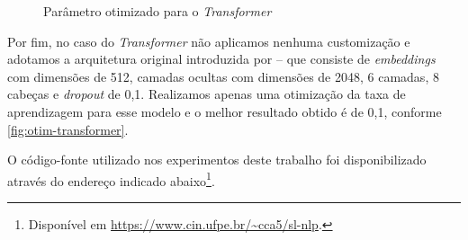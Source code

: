 \begin{figure}[ht!]
    \centering
    \caption{\textmd{Parâmetro otimizado para o \textit{Transformer}}}
    \nomefonte{}
    \label{fig:otim-transformer}
\end{figure}



Por fim, no caso do \textit{Transformer} não aplicamos nenhuma customização e adotamos a arquitetura original introduzida por  -- que consiste de \textit{embeddings} com dimensões de 512, camadas ocultas com dimensões de 2048, 6 camadas, 8 cabeças e \textit{dropout} de 0,1.
Realizamos apenas uma otimização da taxa de aprendizagem para esse modelo e o melhor resultado obtido é de 0,1, conforme \autoref{fig:otim-transformer}.


O código-fonte utilizado nos experimentos deste trabalho foi disponibilizado através do endereço indicado abaixo\footnote{
    Disponível em \url{https://www.cin.ufpe.br/~cca5/sl-nlp}.
}.



